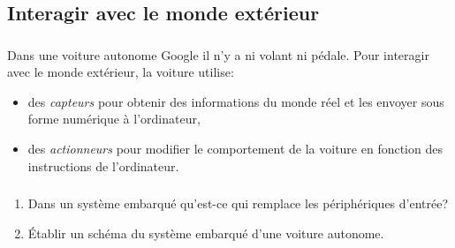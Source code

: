 \documentclass[svgnames,11pt]{beamer}
\begin{document}
\subsection{Interagir avec le monde extérieur}
\begin{frame}
    \frametitle{}

    Dans une voiture autonome Google il n'y a ni volant ni pédale. Pour interagir avec le monde extérieur, la voiture utilise:
\begin{itemize}
    \item<1-> des \emph{capteurs} pour obtenir des informations du monde réel et les envoyer sous forme numérique à l'ordinateur,
    \item<2-> des \emph{actionneurs} pour modifier le comportement de la voiture en fonction des instructions de l'ordinateur.
\end{itemize}

\end{frame}
\begin{frame}
    \frametitle{}

    \begin{center}
        \label{sie}
        \end{center}  

\end{frame}
\begin{frame}
    \frametitle{}

    \begin{activite}
        \begin{enumerate}
            \item Dans un système embarqué qu'est-ce qui remplace les périphériques d'entrée?
            \item Établir un schéma du système embarqué d'une voiture autonome.
        \end{enumerate}
        \end{activite}

\end{frame}
\end{document}
